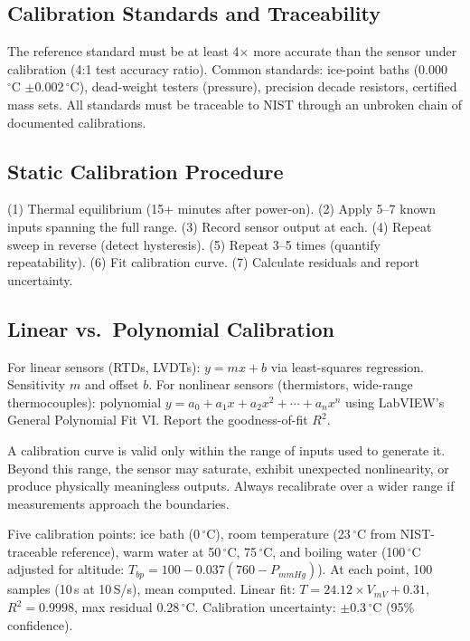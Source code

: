 \documentclass[11pt,letterpaper,twoside,openany]{book}
\newcommand{\degC}{\ensuremath{{}^{\circ}\text{C}}}
\begin{document}
\subsection{Calibration Standards and Traceability}
The reference standard must be at least 4$\times$ more accurate than the sensor under calibration (4:1 test accuracy ratio). Common standards: ice-point baths (0.000\,\degC{} $\pm$0.002\,\degC{}), dead-weight testers (pressure), precision decade resistors, certified mass sets. All standards must be traceable to NIST through an unbroken chain of documented calibrations.

\subsection{Static Calibration Procedure}
(1) Thermal equilibrium (15+ minutes after power-on). (2) Apply 5--7 known inputs spanning the full range. (3) Record sensor output at each. (4) Repeat sweep in reverse (detect hysteresis). (5) Repeat 3--5 times (quantify repeatability). (6) Fit calibration curve. (7) Calculate residuals and report uncertainty.

\subsection{Linear vs.\ Polynomial Calibration}
For linear sensors (RTDs, LVDTs): $y = mx + b$ via least-squares regression. Sensitivity $m$ and offset $b$. For nonlinear sensors (thermistors, wide-range thermocouples): polynomial $y = a_0 + a_1 x + a_2 x^2 + \cdots + a_n x^n$ using LabVIEW's General Polynomial Fit VI. Report the goodness-of-fit $R^2$.

\begin{warningbox}
A calibration curve is valid only within the range of inputs used to generate it. Beyond this range, the sensor may saturate, exhibit unexpected nonlinearity, or produce physically meaningless outputs. Always recalibrate over a wider range if measurements approach the boundaries.
\end{warningbox}

\begin{examplebox}
Five calibration points: ice bath (0\,\degC{}), room temperature (23\,\degC{} from NIST-traceable reference), warm water at 50\,\degC{}, 75\,\degC{}, and boiling water (100\,\degC{} adjusted for altitude: $T_{bp} = 100 - 0.037(760 - P_{mmHg})$). At each point, 100 samples (10\,s at 10\,S/s), mean computed. Linear fit: $T = 24.12 \times V_{mV} + 0.31$, $R^2 = 0.9998$, max residual 0.28\,\degC{}. Calibration uncertainty: $\pm$0.3\,\degC{} (95\% confidence).
\end{examplebox}
\end{document}

